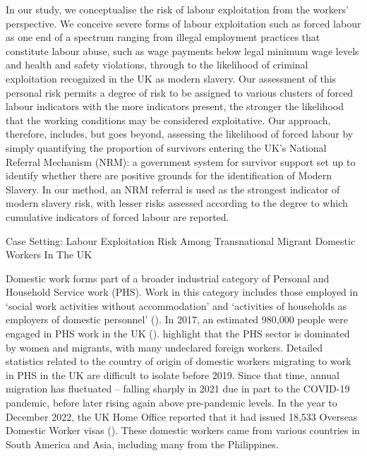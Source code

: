 \documentclass[
  12pt,
  letterpaper,
  DIV=11,
  numbers=noendperiod]{scrartcl}
\theoremstyle{plain}
\theoremstyle{definition}
\begin{document}
In our study, we conceptualise the risk of labour exploitation from the
workers' perspective. We conceive severe forms of labour exploitation
such as forced labour as one end of a spectrum ranging from illegal
employment practices that constitute labour abuse, such as wage payments
below legal minimum wage levels and health and safety violations,
through to the likelihood of criminal exploitation recognized in the UK
as modern slavery. Our assessment of this personal risk permits a degree
of risk to be assigned to various clusters of forced labour indicators
with the more indicators present, the stronger the likelihood that the
working conditions may be considered exploitative. Our approach,
therefore, includes, but goes beyond, assessing the likelihood of forced
labour by simply quantifying the proportion of survivors entering the
UK's National Referral Mechanism (NRM): a government system for survivor
support set up to identify whether there are positive grounds for the
identification of Modern Slavery. In our method, an NRM referral is used
as the strongest indicator of modern slavery risk, with lesser risks
assessed according to the degree to which cumulative indicators of
forced labour are reported.

Case Setting: Labour Exploitation Risk Among Transnational Migrant
Domestic Workers In The UK

Domestic work forms part of a broader industrial category of Personal
and Household Service work (PHS). Work in this category includes those
employed in `social work activities without accommodation' and
`activities of households as employers of domestic personnel'
(\textcite{european_commission_staff_2012}). In 2017, an estimated
980,000 people were engaged in PHS work in the UK
(\textcite{manoudi_analysis_2018}). \textcite{manoudi_analysis_2018}
highlight that the PHS sector is dominated by women and migrants, with
many undeclared foreign workers. Detailed statistics related to the
country of origin of domestic workers migrating to work in PHS in the UK
are difficult to isolate before 2019. Since that time, annual migration
has fluctuated -- falling sharply in 2021 due in part to the COVID-19
pandemic, before later rising again above pre-pandemic levels. In the
year to December 2022, the UK Home Office reported that it had issued
18,533 Overseas Domestic Worker visas (\textcite{home_office_why_2023}).
These domestic workers came from various countries in South America and
Asia, including many from the Philippines.
\end{document}
